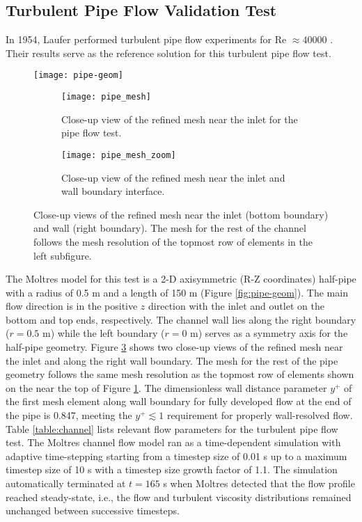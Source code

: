 \subsection{Turbulent Pipe Flow Validation Test}

In 1954, Laufer performed turbulent pipe flow experiments for Re $\approx 40000$
\cite{laufer_structure_1954}. Their results serve as the reference solution for this turbulent pipe
flow test.

\begin{figure}[p]
  \centering
  \texttt{[image: pipe-geom]}
  \caption{Pipe geometry for the turbulent pipe flow verification test. The red box indicates
  the region shown by the close-up views in Figure \ref{fig:pipe-mesh}.}
  \label{fig:pipe-geom}
  \centering
  \begin{subfigure}[b]{0.40\columnwidth}
    \centering
    \texttt{[image: pipe\_mesh]}
    \caption{Close-up view of the refined mesh near the inlet for the pipe flow test.}
    \label{fig:pipe-mesh-1}
  \end{subfigure}
  \hfill
  \begin{subfigure}[b]{0.53\columnwidth}
    \centering
    \texttt{[image: pipe\_mesh\_zoom]}
    \caption{Close-up view of the refined mesh near the inlet and wall boundary interface.}
    \label{fig:pipe-mesh-2}
  \end{subfigure}
  \caption{Close-up views of the refined mesh near the inlet (bottom boundary) and wall (right
  boundary). The mesh for the rest of the channel follows the mesh resolution of the topmost row of
  elements in the left subfigure.}
  \label{fig:pipe-mesh}
\end{figure}

The Moltres model for this test is a 2-D axisymmetric (R-Z coordinates) half-pipe with a radius of
0.5 m and a length of 150 m (Figure \ref{fig:pipe-geom}). The main flow direction
is in the positive $z$ direction with the inlet and outlet on the bottom and top ends,
respectively. The channel wall lies along the right boundary ($r=0.5$ m) while the left boundary
($r=0$ m) serves as a symmetry axis for the half-pipe geometry. Figure \ref{fig:pipe-mesh} shows
two close-up views of the refined mesh near the inlet and along the right wall boundary. The mesh
for the rest of the pipe geometry follows the same mesh resolution as the topmost row of
elements shown on the near the top of Figure \ref{fig:pipe-mesh-1}. The dimensionless wall distance
parameter $y^+$ of the first mesh element along wall boundary for fully developed flow at the end
of the pipe is 0.847, meeting the
$y^+ \lesssim 1$ requirement for properly wall-resolved flow. Table \ref{table:channel} lists
relevant flow parameters for the turbulent pipe flow test. The Moltres channel flow model ran as a
time-dependent simulation with adaptive time-stepping starting from a timestep size of 0.01
s up to a maximum timestep size of 10 s with a timestep size growth factor of 1.1. The simulation
automatically terminated at $t=165$ s when Moltres detected that the flow profile reached
steady-state, i.e., the flow and turbulent viscosity distributions remained unchanged between
successive timesteps.


